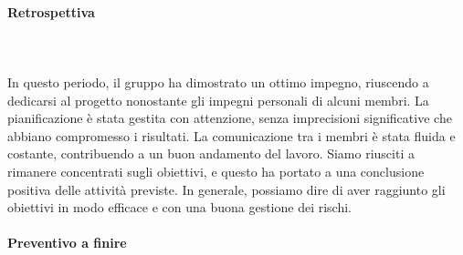 \paragraph{Retrospettiva} \hspace{1cm} 
\\ \hspace{1cm} \\
In questo periodo, il gruppo ha dimostrato un ottimo impegno, riuscendo a dedicarsi al progetto nonostante gli impegni personali di alcuni membri. La pianificazione è stata gestita con attenzione, senza imprecisioni significative che abbiano compromesso i risultati. La comunicazione tra i membri è stata fluida e costante, contribuendo a un buon andamento del lavoro. Siamo riusciti a rimanere concentrati sugli obiettivi, e questo ha portato a una conclusione positiva delle attività previste. In generale, possiamo dire di aver raggiunto gli obiettivi in modo efficace e con una buona gestione dei rischi.

\paragraph{Preventivo a finire} \hspace{1cm}

\begin{table}[H]
\centering
{}
\caption{Preventivo a finire dopo la retrospettiva sul periodo VIII}
\end{table}



